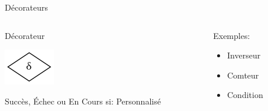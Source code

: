 \documentclass[presentation]{beamer}
\begin{document}
\begin{frame}[label=sec-2-1-4]{Décorateurs}
\begin{columns}
\begin{column}{0.5\textwidth}

\begin{center}
\alert{Décorateur}
\end{center}

\includegraphics[width=.9\linewidth]{img/Decorateur.png}


Succès, Échec ou En Cours si: 
Personnalisé
\end{column}

\begin{column}{0.5\textwidth}
Exemples:
\begin{itemize}
\item Inverseur
\item Comteur
\item Condition
\end{itemize}
\end{column}
\end{columns}
\end{frame}
\end{document}
